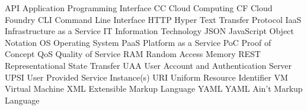 
 {API} {Application Programming Interface}
 {CC} {Cloud Computing}
 {CF} {Cloud Foundry}
 {CLI} {Command Line Interface}
 {HTTP} {Hyper Text Transfer Protocol}
 {IaaS} {Infrastructure as a Service}
 {IT} {Information Technology}
 {JSON} {JavaScript Object Notation}
 {OS} {Operating System}
 {PaaS} {Platform as a Service}
 {PoC} {Proof of Concept}
 {QoS} {Quality of Service}
 {RAM} {Random Access Memory}
 {REST} {Representational State Transfer}
 {UAA} {User Account and Authentication Server}
 {UPSI} {User Provided Service Instance(s)}
 {URI} {Uniform Resource Identifier}
 {VM} {Virtual Machine}
 {XML} {Extensible Markup Language}
 {YAML} {YAML Ain't Markup Language}
